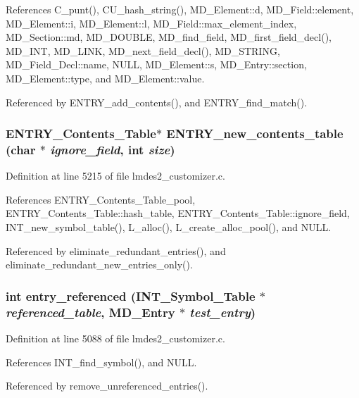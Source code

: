 References C\_\-punt(), CU\_\-hash\_\-string(), MD\_\-Element::d, MD\_\-Field::element, MD\_\-Element::i, MD\_\-Element::l, MD\_\-Field::max\_\-element\_\-index, MD\_\-Section::md, MD\_\-DOUBLE, MD\_\-find\_\-field, MD\_\-first\_\-field\_\-decl(), MD\_\-INT, MD\_\-LINK, MD\_\-next\_\-field\_\-decl(), MD\_\-STRING, MD\_\-Field\_\-Decl::name, NULL, MD\_\-Element::s, MD\_\-Entry::section, MD\_\-Element::type, and MD\_\-Element::value.

Referenced by ENTRY\_\-add\_\-contents(), and ENTRY\_\-find\_\-match().
\subsubsection{\setlength{\rightskip}{0pt plus 5cm}\bf{ENTRY\_\-Contents\_\-Table}$\ast$ ENTRY\_\-new\_\-contents\_\-table (char $\ast$ {\em ignore\_\-field}, int {\em size})}\label{lmdes2__customizer_8c_f16fbbf8f638e1751157ef9598f2ef3a}




Definition at line 5215 of file lmdes2\_\-customizer.c.

References ENTRY\_\-Contents\_\-Table\_\-pool, ENTRY\_\-Contents\_\-Table::hash\_\-table, ENTRY\_\-Contents\_\-Table::ignore\_\-field, INT\_\-new\_\-symbol\_\-table(), L\_\-alloc(), L\_\-create\_\-alloc\_\-pool(), and NULL.

Referenced by eliminate\_\-redundant\_\-entries(), and eliminate\_\-redundant\_\-new\_\-entries\_\-only().
\subsubsection{\setlength{\rightskip}{0pt plus 5cm}int entry\_\-referenced (\bf{INT\_\-Symbol\_\-Table} $\ast$ {\em referenced\_\-table}, \bf{MD\_\-Entry} $\ast$ {\em test\_\-entry})}\label{lmdes2__customizer_8c_576134def61f55e5825097f6c622e8be}




Definition at line 5088 of file lmdes2\_\-customizer.c.

References INT\_\-find\_\-symbol(), and NULL.

Referenced by remove\_\-unreferenced\_\-entries().
